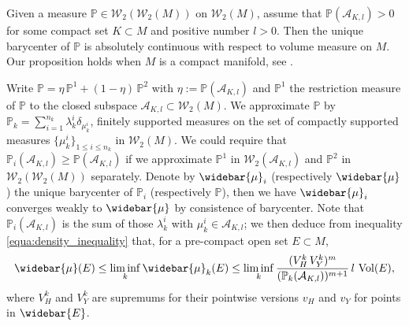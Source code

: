 \begin{conj}
	\label{thm:absolute_continuity_general}
	Given a measure $\mathbb{P} \in \mathcal{W}_2(\mathcal{W}_2(M))$ on $\mathcal{W}_2(M)$,
	assume that $\mathbb{P}(\mathcal{A}_{K,l}) >0$ for some compact set $K \subset M$ and positive
	number $l > 0$.
	Then the unique barycenter of $\mathbb{P}$
	is absolutely continuous with respect to volume measure on $M$.
	Our proposition holds when $M$ is a compact manifold, see \cite{KIM2017640}.
\end{conj}

Write $\mathbb{P} = \eta\, \mathbb{P}^1 + (1 - \eta)\, \mathbb{P}^2$ with
$\eta := \mathbb{P}(\mathcal{A}_{K,l})$ and $\mathbb{P}^1$ the
restriction measure of $\mathbb{P}$ to the closed subspace $\mathcal{A}_{K,l} \subset \mathcal{W}_2(M)$.
We approximate $\mathbb{P}$ by $ \mathbb{P}_k = \sum_{i=1}^{n_k} \lambda_k^i \delta_{\mu_k^i} $,
finitely supported measures on the set of compactly supported measures
$\{ \mu_k^i\}_{1 \leq i \leq n_k}$ in $\mathcal{W}_2(M)$.
We could require that $\mathbb{P}_i (\mathcal{A}_{K,l}) \geq \mathbb{P} (\mathcal{A}_{K,l})$
if we approximate $\mathbb{P}^1 $ in $\mathcal{W}_2(\mathcal{A}_{K,l})$
and $\mathbb{P}^2$ in $\mathcal{W}_2(\mathcal{W}_2(M))$ separately.
Denote by $\widebar{\mu}_i$ (respectively $\widebar{\mu}$) the unique barycenter of
$\mathbb{P}_i$ (respectively $\mathbb{P}$),
then we have $\widebar{\mu}_i$ converges weakly to $\widebar{\mu}$ by consistence of barycenter.
Note that $\mathbb{P}_i(\mathcal{A}_{K,l})$ is the sum of those $\lambda_k^i$ with $\mu_k^i \in \mathcal{A}_{K,l}$;
we then deduce from inequality \cref{equa:density_inequality} that,
for a pre-compact open set $E \subset M$,
\[
	\widebar{\mu}(E) \leq \liminf_k \widebar{\mu}_k(E) \leq
	\liminf_k \frac{(V_H^k\, V_Y^k)^m}{(\mathbb{P}_k(\mathcal{A}_{K,l}))^{m+1}}
	\,l\, \operatorname{Vol}(E),
\]
where $V_H^k$ and $V_Y^k$ are supremums for their pointwise versions $v_H$ and $v_Y$ for points in $\widebar{E}$.
